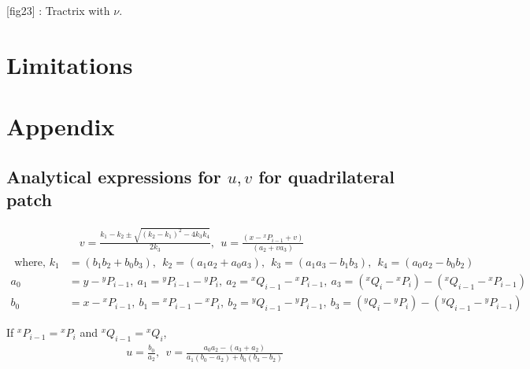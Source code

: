 \documentclass[11pt,a4paper]{article}
\begin{document}
[fig23] : Tractrix with $\nu$.

\section{Limitations}

\section*{Appendix}
\subsection*{Analytical expressions for $u,v$ for quadrilateral patch}
\begin{align}
&\quad {v} = \frac{k_1-k_2\pm \sqrt{\left(k_2-k_1\right)^2-4k_3k_4}}{2k_3},~~{u} = \frac{\left(x-{}^xP_{i-1}+{v}\right)}{\left( a_2+{v} a_3 \right)}\\
\nonumber\text{ where, }k_1 &= \left(b_1b_2+b_0b_3 \right),~~k_2 = \left(a_1a_2+a_0a_3 \right),~~
k_3 = \left(a_1a_3-b_1b_3 \right),~~k_4=\left(a_0a_2-b_0b_2 \right)\\
\nonumber a_0 &= y-{}^yP_{i-1},~a_1 = {}^yP_{i-1}-{}^yP_i,~a_2 = {}^xQ_{i-1}-{}^xP_{i-1},~a_3 = \left({}^xQ_{i}-{}^xP_i\right)-\left({}^xQ_{i-1}-{}^xP_{i-1}\right)\\
\nonumber b_0 &= x-{}^xP_{i-1},~b_1 = {}^xP_{i-1}-{}^xP_i,~b_2 = {}^yQ_{i-1}-{}^yP_{i-1},~b_3 = \left({}^yQ_{i}-{}^yP_i\right)-\left({}^yQ_{i-1}-{}^yP_{i-1}\right)
\end{align}

If ${}^xP_{i-1}={}^xP_{i}$ and ${}^xQ_{i-1}={}^xQ_{i}$, 
\begin{align}
{u} = \frac{b_0}{a_2},~~{v} = \frac{a_0a_2-\left(a_3+a_2 \right)}{a_1\left(b_0-a_2\right)+b_0\left(b_3-b_2 \right)}
\end{align}
\end{document}
